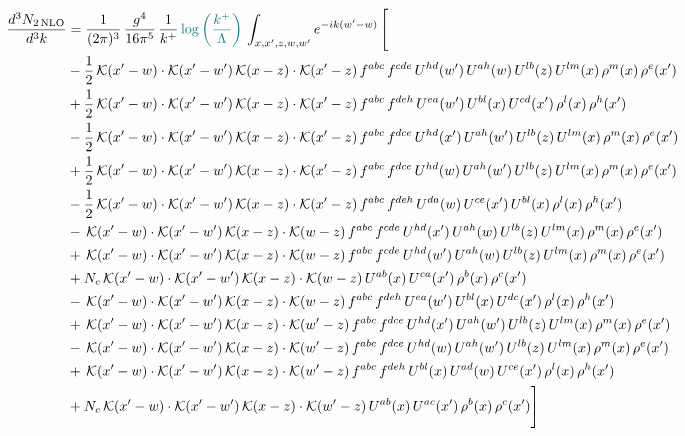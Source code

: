 \documentclass[9pt]{article}
\numberwithin{equation}{section}
\begin{document}
\begin{align}
\frac{d^{3}N_{2\,\mathrm{NLO}}}{d^{3}k} & = \frac{1}{(2\pi)^{3}}\,\frac{g^{4}}{16\pi^{5}}\,\frac{1}{k^{+}}\,{\color{teal}\log{\left(\frac{k^{+}}{\Lambda}\right)}}\,\int_{x,x',z,w,w'}e^{-ik(w'-w)}\,\Bigg[\notag\\ & -\frac{1}{2}\,\mathcal{K}(x'-w)\cdot\mathcal{K}(x'-w')\,\mathcal{K}(x-z)\cdot\mathcal{K}(x'-z)\,f^{abc}\,f^{cde}\,U^{hd}(w')\,U^{ah}(w)\,U^{lb}(z)\,U^{lm}(x)\,\rho^{m}(x)\,\rho^{e}(x')\notag\\
& +\frac{1}{2}\,\mathcal{K}(x'-w)\cdot\mathcal{K}(x'-w')\,\mathcal{K}(x-z)\cdot\mathcal{K}(x'-z)\,f^{abc}\,f^{deh}\,U^{ea}(w')\,U^{bl}(x)\,U^{cd}(x')\,\rho^{l}(x)\,\rho^{h}(x')\notag\\
& -\frac{1}{2}\,\mathcal{K}(x'-w)\cdot\mathcal{K}(x'-w')\,\mathcal{K}(x-z)\cdot\mathcal{K}(x'-z)\,f^{abc}\,f^{dce}\,U^{hd}(x')\,U^{ah}(w')\,U^{lb}(z)\,U^{lm}(x)\,\rho^{m}(x)\,\rho^{e}(x')\notag\\
& +\frac{1}{2}\,\mathcal{K}(x'-w)\cdot\mathcal{K}(x'-w')\,\mathcal{K}(x-z)\cdot\mathcal{K}(x'-z)\,f^{abc}\,f^{dce}\,U^{hd}(w)\,U^{ah}(w')\,U^{lb}(z)\,U^{lm}(x)\,\rho^{m}(x)\,\rho^{e}(x')\notag\\
& -\frac{1}{2}\,\mathcal{K}(x'-w)\cdot\mathcal{K}(x'-w')\,\mathcal{K}(x-z)\cdot\mathcal{K}(x'-z)\,f^{abc}\,f^{deh}\,U^{da}(w)\,U^{ce}(x')\,U^{bl}(x)\,\rho^{l}(x)\,\rho^{h}(x')\notag\\
& -\,\mathcal{K}(x'-w)\cdot\mathcal{K}(x'-w')\,\mathcal{K}(x-z)\cdot\mathcal{K}(w-z)\,f^{abc}\,f^{cde}\,U^{hd}(x')\,U^{ah}(w)\,U^{lb}(z)\,U^{lm}(x)\,\rho^{m}(x)\,\rho^{e}(x') \notag \\ &  +\,\mathcal{K}(x'-w)\cdot\mathcal{K}(x'-w')\,\mathcal{K}(x-z)\cdot\mathcal{K}(w-z)\,f^{abc}\,f^{cde}\,U^{hd}(w')\,U^{ah}(w)\,U^{lb}(z)\,U^{lm}(x)\,\rho^{m}(x)\,\rho^{e}(x')\notag\\
& +N_{c}\,\mathcal{K}(x'-w)\cdot\mathcal{K}(x'-w')\,\mathcal{K}(x-z)\cdot\mathcal{K}(w-z)\,U^{ab}(x)\,U^{ca}(x')\,\rho^{b}(x)\,\rho^{c}(x')\notag\\
& -\,\mathcal{K}(x'-w)\cdot\mathcal{K}(x'-w')\,\mathcal{K}(x-z)\cdot\mathcal{K}(w-z)\,f^{abc}\,f^{deh}\,U^{ea}(w')\,U^{bl}(x)\,U^{dc}(x')\,\rho^{l}(x)\,\rho^{h}(x')\notag\\
& +\,\mathcal{K}(x'-w)\cdot\mathcal{K}(x'-w')\,\mathcal{K}(x-z)\cdot\mathcal{K}(w'-z)\,f^{abc}\,f^{dce}\,U^{hd}(x')\,U^{ah}(w')\,U^{lb}(z)\,U^{lm}(x)\,\rho^{m}(x)\,\rho^{e}(x')\notag\\
& -\,\mathcal{K}(x'-w)\cdot\mathcal{K}(x'-w')\,\mathcal{K}(x-z)\cdot\mathcal{K}(w'-z)\,f^{abc}\,f^{dce}\,U^{hd}(w)\,U^{ah}(w')\,U^{lb}(z)\,U^{lm}(x)\,\rho^{m}(x)\,\rho^{e}(x')\notag\\
& +\,\mathcal{K}(x'-w)\cdot\mathcal{K}(x'-w')\,\mathcal{K}(x-z)\cdot\mathcal{K}(w'-z)\,f^{abc}\,f^{deh}\,U^{bl}(x)\,U^{ad}(w)\,U^{ce}(x')\,\rho^{l}(x)\,\rho^{h}(x')\notag\\
& +N_{c}\,\mathcal{K}(x'-w)\cdot\mathcal{K}(x'-w')\,\mathcal{K}(x-z)\cdot\mathcal{K}(w'-z)\,U^{ab}(x)\,U^{ac}(x')\,\rho^{b}(x)\,\rho^{c}(x')\Bigg]
\end{align}
\end{document}
